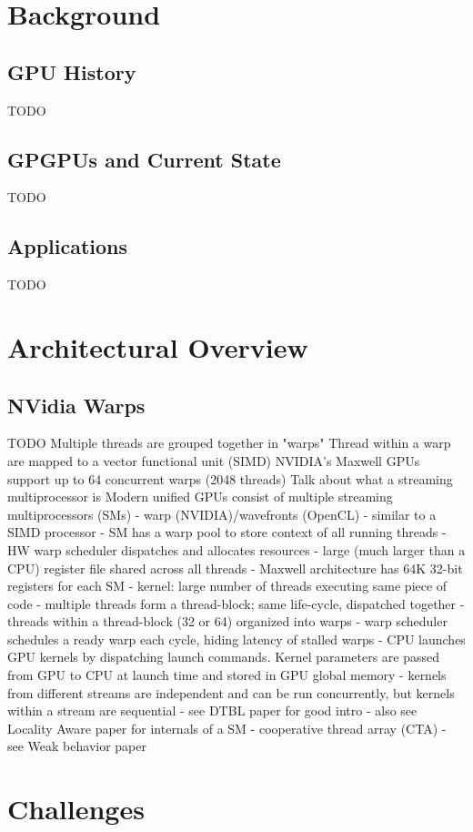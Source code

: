 \documentclass[prodmode,acmtecs]{acmsmall} %
\begin{document}
\section{Background}
\subsection{GPU History}
TODO
\subsection{GPGPUs and Current State}
TODO
\subsection{Applications}
TODO

\section{Architectural Overview}
\subsection{NVidia Warps}
TODO
Multiple threads are grouped together in "warps"
Thread within a warp are mapped to a vector functional unit (SIMD)
NVIDIA's Maxwell GPUs support up to 64 concurrent warps (2048 threads)
Talk about what a streaming multiprocessor is
Modern unified GPUs consist of multiple streaming multiprocessors (SMs)
  - warp (NVIDIA)/wavefronts (OpenCL)
  - similar to a SIMD processor
  - SM has a warp pool to store context of all running threads
  - HW warp scheduler dispatches and allocates resources
  - large (much larger than a CPU) register file shared across all threads
    - Maxwell architecture has 64K 32-bit registers for each SM
  - kernel: large number of threads executing same piece of code
  - multiple threads form a thread-block; same life-cycle, dispatched together
  - threads within a thread-block (32 or 64) organized into warps
  - warp scheduler schedules a ready warp each cycle, hiding latency of stalled warps
  - CPU launches GPU kernels by dispatching launch commands. Kernel parameters are passed from GPU to CPU at launch time and stored in GPU global memory
  - kernels from different streams are independent and can be run concurrently, but kernels within a stream are sequential
  - see DTBL paper for good intro
  - also see Locality Aware paper for internals of a SM
  - cooperative thread array (CTA) - see Weak behavior paper

\section{Challenges}
\end{document}
